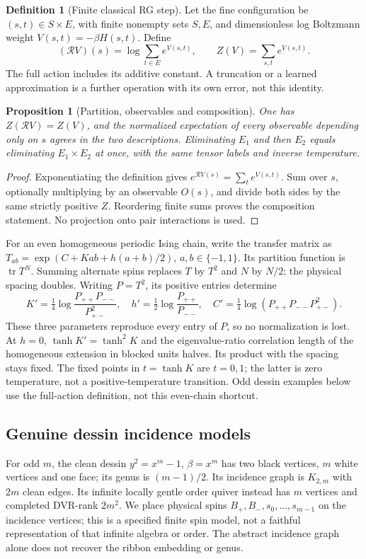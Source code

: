 \documentclass[11pt,oneside,openany]{book}
\newtheorem{proposition}[theorem]{Proposition}
\theoremstyle{definition}\newtheorem{definition}[theorem]{Definition}
\theoremstyle{remark}\newtheorem{remark}[theorem]{Remark}
\begin{document}
\begin{definition}[Finite classical RG step]
Let the fine configuration be $(s,t)\in S\times E $, with finite nonempty
sets $ S,E $, and dimensionless log Boltzmann weight $ V(s,t)=-\beta H(s,t)$.
Define
\[
 (\mathcal RV)(s)=\log\sum_{t\in E}e^{V(s,t)},\qquad
 Z(V)=\sum_{s,t}e^{V(s,t)}.
\]
The full action includes its additive constant. A truncation or a learned
approximation is a further operation with its own error, not this identity.
\end{definition}
\begin{proposition}[Partition, observables and composition]\label{rg:exact}
One has $ Z(\mathcal RV)=Z(V)$, and the normalized expectation of every
observable depending only on $ s $ agrees in the two descriptions. Eliminating
$ E_1$ and then $ E_2$ equals eliminating $ E_1\times E_2$ at once, with the
same tensor labels and inverse temperature.
\end{proposition}
\begin{proof}
Exponentiating the definition gives $ e^{\mathcal RV(s)}=\sum_te^{V(s,t)}$.
Sum over $ s $, optionally multiplying by an observable $ O(s)$, and divide
both sides by the same strictly positive $ Z $. Reordering finite sums proves
the composition statement. No projection onto pair interactions is used.
\end{proof}

For an even homogeneous periodic Ising chain, write the transfer matrix as
$ T_{ab}=\exp(C+Kab+h(a+b)/2)$, $ a,b\in\{-1,1\}$.
Its partition function is $\operatorname{tr}T^N $. Summing alternate spins
replaces $ T $ by $ T^2$ and $ N $ by $ N/2$; the physical spacing doubles.
Writing $ P=T^2$, its positive entries determine
\[
 K'=\tfrac 14\log\frac{P_{++}P_{--}}{P_{+-}^2},\quad
 h'=\tfrac 12\log\frac{P_{++}}{P_{--}},\quad
 C'=\tfrac 14\log(P_{++}P_{--}P_{+-}^2).
\]
These three parameters reproduce every entry of $ P $, so no normalization
is lost. At $ h=0$, $\tanh K'=\tanh^2 K $ and the eigenvalue-ratio correlation length of the homogeneous extension
in blocked units halves. Its product with the spacing stays fixed. The
fixed points in $ t=\tanh K $ are $ t=0,1$; the latter is zero temperature,
not a positive-temperature transition. Odd dessin examples below use the
full-action definition, not this even-chain shortcut.

\subsection{Genuine dessin incidence models}
For odd $ m $, the clean dessin $ y^2=x^m-1$, $\beta=x^m $ has two black
vertices, $ m $ white vertices and one face; its genus is $(m-1)/2$.
Its incidence graph is $ K_{2,m}$ with $2 m $ clean edges. Its infinite
locally gentle order quiver instead has $ m $ vertices and completed
DVR-rank $2 m^2$. We place physical spins $ B_+,B_-,s_0,\ldots,s_{m-1}$
on the incidence vertices; this is a specified finite spin model, not a
faithful representation of that infinite algebra or order. The abstract
incidence graph alone does not recover the ribbon embedding or genus.
\end{document}
